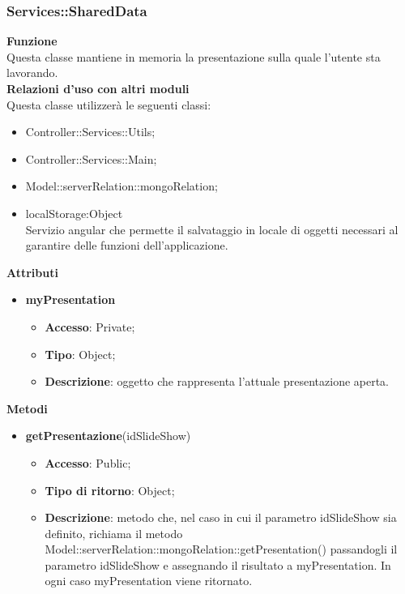 {{		\subsubsection{Services::\-SharedData}{
			\label{sub:servicesSharedData}
			\textbf{Funzione}\\
			\indent Questa classe mantiene in memoria la presentazione sulla quale l'utente sta lavorando.\\
			\textbf{Relazioni d'uso con altri moduli}\\
			\indent Questa classe utilizzerà le seguenti classi:
			\begin{itemize}
				\item Controller::Services::\-Utils;
				\item Controller::Services::\-Main;
				\item Model::serverRelation::mongoRelation;
				\item localStorage:Object\\
					\indent Servizio angular che permette il salvataggio in locale di oggetti necessari al  garantire delle funzioni dell'applicazione.
			\end{itemize}
			\textbf{Attributi}\\
			\begin{itemize}
				\item \textbf{myPresentation}
				\begin{itemize}
					\item \textbf{Accesso}: Private;
					\item \textbf{Tipo}: Object;
					\item \textbf{Descrizione}: oggetto che rappresenta l'attuale presentazione aperta.
				\end{itemize}
			\end{itemize}
			\textbf{Metodi}
			\begin{itemize}
				\item \textbf{getPresentazione}(idSlideShow)
				\begin{itemize}
					\item \textbf{Accesso}: Public;
					\item \textbf{Tipo di ritorno}: Object;
					\item \textbf{Descrizione}: metodo che, nel caso in cui il parametro idSlideShow sia definito, richiama il metodo Model::\-serverRelation::\-mongoRelation::\-getPresentation() passandogli il parametro idSlideShow e assegnando il risultato a myPresentation. In ogni caso myPresentation viene ritornato.
				\end{itemize}
			\end{itemize}
		}
}}
